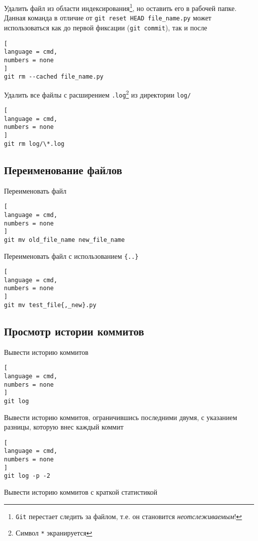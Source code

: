 \documentclass[%
	11pt,
	a4paper,
	utf8,
		]{article}
\begin{document}
Удалить файл из области индексирования\footnote{\texttt{Git} перестает следить за файлом, т.е. он становится \emph{неотслеживаемым}!}, но оставить его в рабочей папке. Данная команда в отличие от \texttt{git reset HEAD file\_name.py} может использоваться как до первой фиксации (\texttt{git commit}), так и после

\begin{lstlisting}[
language = cmd,
numbers = none
]
git rm --cached file_name.py
\end{lstlisting}


Удалить все файлы с расширением \texttt{.log}\footnote{Символ \texttt{*} экранируется} из директории \texttt{log/}

\begin{lstlisting}[
language = cmd,
numbers = none
]
git rm log/\*.log
\end{lstlisting}


\subsection{Переименование файлов}

Переименовать файл

\begin{lstlisting}[
language = cmd,
numbers = none
]
git mv old_file_name new_file_name
\end{lstlisting}


Переименовать файл с использованием \texttt{\{..\}}
\begin{lstlisting}[
language = cmd,
numbers = none
]
git mv test_file{,_new}.py
\end{lstlisting}


\subsection{Просмотр истории коммитов}

Вывести историю коммитов

\begin{lstlisting}[
language = cmd,
numbers = none
]
git log
\end{lstlisting}


Вывести историю коммитов, ограничившись последними двумя, с указанием разницы, которую внес каждый коммит

\begin{lstlisting}[
language = cmd,
numbers = none
]
git log -p -2
\end{lstlisting}

Вывести историю коммитов с краткой статистикой
\end{document}
